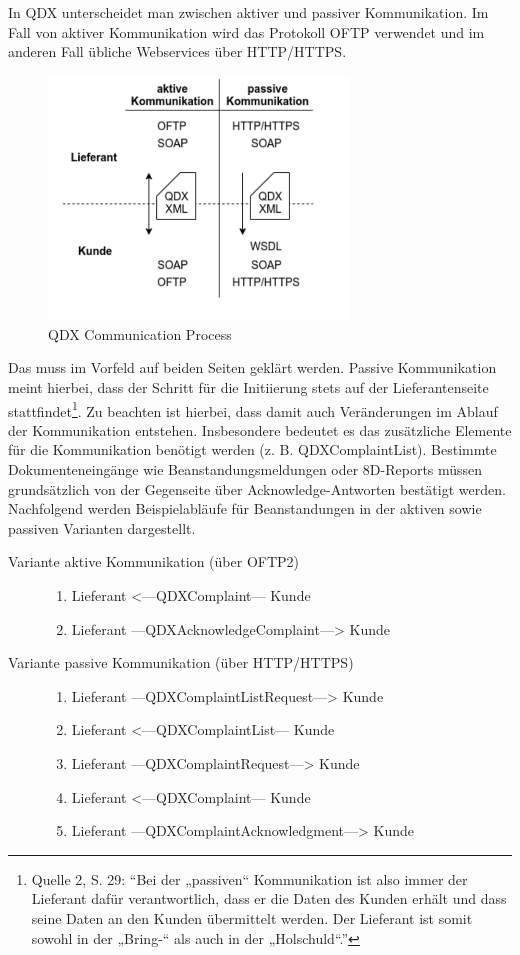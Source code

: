 In QDX unterscheidet man zwischen aktiver und passiver Kommunikation. Im Fall von aktiver Kommunikation wird das Protokoll OFTP verwendet und im anderen Fall übliche Webservices über HTTP/HTTPS.

\begin{figure}[!h]
\centering
\includegraphics[width=8cm]{images/0x_requirement_analysis/qdx_communication_process}
\caption{QDX Communication Process}
\end{figure}

Das muss im Vorfeld auf beiden Seiten geklärt werden. Passive Kommunikation meint hierbei, dass der Schritt für die Initiierung stets auf der Lieferantenseite stattfindet\footnote{Quelle 2, S. 29: “Bei der „passiven“ Kommunikation ist also immer der Lieferant dafür verantwortlich, dass er die Daten des Kunden erhält und dass seine Daten an den Kunden übermittelt werden. Der Lieferant ist somit sowohl in der „Bring-“ als auch in der „Holschuld“.”}. Zu beachten ist hierbei, dass damit auch Veränderungen im Ablauf der Kommunikation entstehen. Insbesondere bedeutet es das zusätzliche Elemente für die Kommunikation benötigt werden (z. B. QDXComplaintList).
Bestimmte Dokumenteneingänge wie Beanstandungsmeldungen oder 8D-Reports müssen grundsätzlich von der Gegenseite über Acknowledge-Antworten bestätigt werden.
Nachfolgend werden Beispielabläufe für Beanstandungen in der aktiven sowie passiven Varianten dargestellt.

\begin{description}
\item [Variante aktive Kommunikation (über OFTP2)]\hfill
    \begin{enumerate}
        \item Lieferant <—QDXComplaint— Kunde
        \item Lieferant —QDXAcknowledgeComplaint—> Kunde
    \end{enumerate}
\item [Variante passive Kommunikation (über HTTP/HTTPS)]\hfill
    \begin{enumerate}
        \item Lieferant —QDXComplaintListRequest—> Kunde
        \item Lieferant <—QDXComplaintList— Kunde
        \item Lieferant —QDXComplaintRequest—> Kunde
        \item Lieferant <—QDXComplaint— Kunde
        \item Lieferant —QDXComplaintAcknowledgment—> Kunde
    \end{enumerate}
\end{description}

